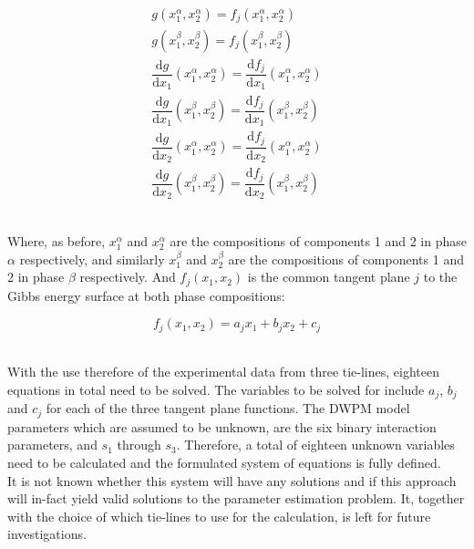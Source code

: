 \begin{eqnarray}
g\left(x_{1}^{\alpha}, x_{2}^{\alpha}\right) = f_{j}\left(x_{1}^{\alpha}, x_{2}^{\alpha}\right) \\
g\left(x_{1}^{\beta}, x_{2}^{\beta}\right) = f_{j}\left(x_{1}^{\beta}, x_{2}^{\beta}\right)\\
\dfrac{\mathrm{d} g}{\mathrm{d}x_{1}}\left(x_{1}^{\alpha}, x_{2}^{\alpha}\right) = \dfrac{\mathrm{d} f_{j}}{\mathrm{d}x_{1}}\left(x_{1}^{\alpha}, x_{2}^{\alpha}\right)\\
\dfrac{\mathrm{d} g}{\mathrm{d}x_{1}}\left(x_{1}^{\beta}, x_{2}^{\beta}\right) = \dfrac{\mathrm{d} f_{j}}{\mathrm{d}x_{1}}\left(x_{1}^{\beta}, x_{2}^{\beta}\right)\\
\dfrac{\mathrm{d} g}{\mathrm{d}x_{2}}\left(x_{1}^{\alpha}, x_{2}^{\alpha}\right) = \dfrac{\mathrm{d} f_{j}}{\mathrm{d}x_{2}}\left(x_{1}^{\alpha}, x_{2}^{\alpha}\right)\\
\dfrac{\mathrm{d} g}{\mathrm{d}x_{2}}\left(x_{1}^{\beta}, x_{2}^{\beta}\right) = \dfrac{\mathrm{d} f_{j}}{\mathrm{d}x_{2}}\left(x_{1}^{\beta}, x_{2}^{\beta}\right)
\end{eqnarray}\

Where, as before, $x_{1}^{\alpha}$ and $x_{2}^{\alpha}$ are the compositions of components 1 and 2 in phase $\alpha$ respectively, and similarly $x_{1}^{\beta}$ and $x_{2}^{\beta}$ are the compositions of components 1 and 2 in phase $\beta$ respectively. And $f_{j}\left(x_{1}, x_{2}\right)$ is the common tangent plane $j$ to the Gibbs energy surface at both phase compositions:\

\begin{equation}
f_{j}\left(x_{1}, x_{2}\right) = a_{j}x_{1} + b_{j}x_{2} +c_{j} 
\end{equation}\

With the use therefore of the experimental data from three tie-lines, eighteen equations in total need to be solved. The variables to be solved for include $a_{j}$, $b_{j}$ and $c_{j}$ for each of the three tangent plane functions. The DWPM model parameters which are assumed to be unknown, are the six binary interaction parameters, and $s_{1}$ through $s_{3}$. Therefore, a total of eighteen unknown variables need to be calculated and the formulated system of equations is fully defined.\\

It is not known whether this system will have any solutions and if this approach will in-fact yield valid solutions to the parameter estimation problem. It, together with the choice of which tie-lines to use for the calculation, is left for future investigations.\\